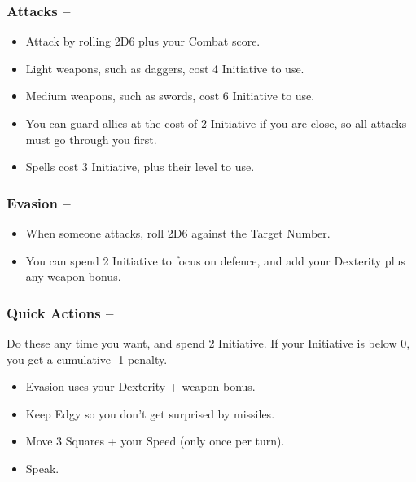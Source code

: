 \begin{multicols}{2}
\begin{itemize}
\end{itemize}

\subsubsection{Attacks -- \pageref{attack}}

\begin{itemize}

	\item{Attack by rolling 2D6 plus your Combat score.}
	\item{Light weapons, such as daggers, cost 4 Initiative to use.}
	\item{Medium weapons, such as swords, cost 6 Initiative to use.}
	\item{You can guard allies at the cost of 2 Initiative if you are close, so all attacks must go through you first.}
	\item{Spells cost 3 Initiative, plus their level to use.}

\end{itemize}

\subsubsection{Evasion -- \pageref{defence}}

\begin{itemize}

	\item{When someone attacks, roll 2D6 against the Target Number.}
	\item{You can spend 2 Initiative to focus on defence, and add your Dexterity plus any weapon bonus.}

\end{itemize}

\subsubsection{Quick Actions -- \pageref{quickaction}}

Do these any time you want, and spend 2 Initiative.
If your Initiative is below 0, you get a cumulative -1 penalty.

\begin{itemize}

	\item{Evasion uses your Dexterity + weapon bonus.}
	\item{Keep Edgy so you don't get surprised by missiles.}
	\item{Move 3 Squares + your Speed (only once per turn).}
	\item{Speak.}


\end{itemize}
\end{multicols}
